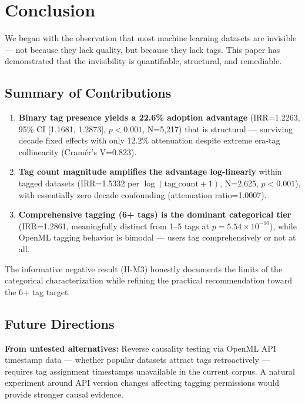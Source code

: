 \section{Conclusion}
\label{sec:conclusion}

We began with the observation that most machine learning datasets are invisible --- not because they lack quality, but because they lack tags. This paper has demonstrated that the invisibility is quantifiable, structural, and remediable.

\subsection{Summary of Contributions}

\begin{enumerate}
\item \textbf{Binary tag presence yields a 22.6\% adoption advantage} (IRR=1.2263, 95\% CI [1.1681, 1.2873], $p<0.001$, N=5,217) that is structural --- surviving decade fixed effects with only 12.2\% attenuation despite extreme era-tag collinearity (Cram\'er's V=0.823).

\item \textbf{Tag count magnitude amplifies the advantage log-linearly} within tagged datasets (IRR=1.5332 per $\log(\text{tag\_count}+1)$, N=2,625, $p<0.001$), with essentially zero decade confounding (attenuation ratio=1.0007).

\item \textbf{Comprehensive tagging (6+ tags) is the dominant categorical tier} (IRR=1.2861, meaningfully distinct from 1--5 tags at $p=5.54 \times 10^{-10}$), while OpenML tagging behavior is bimodal --- users tag comprehensively or not at all.
\end{enumerate}

The informative negative result (H-M3) honestly documents the limits of the categorical characterization while refining the practical recommendation toward the 6+ tag target.

\subsection{Future Directions}

\textbf{From untested alternatives:} Reverse causality testing via OpenML API timestamp data --- whether popular datasets attract tags retroactively --- requires tag assignment timestamps unavailable in the current corpus. A natural experiment around API version changes affecting tagging permissions would provide stronger causal evidence.


